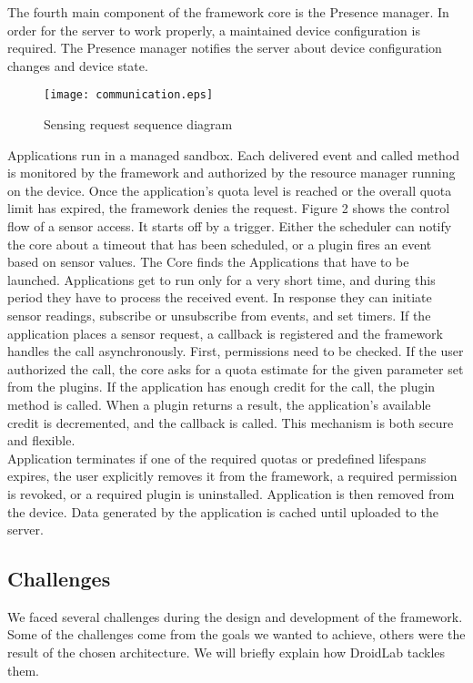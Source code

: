 \documentclass[conference,letterpaper]{IEEEtran}
\begin{document}
\indent The fourth main component of the framework core is the Presence manager. In order for the server to work properly, a maintained device configuration is required. The Presence manager notifies the server about device configuration changes and  device state.
\begin{figure}[h]
\centering
	\texttt{[image: communication.eps]}
	\label{fig:communicationImage}
\caption{Sensing request sequence diagram}
\end{figure}
Applications run in a managed sandbox. Each delivered event and called method is monitored by the framework and authorized by the resource manager running on the device. Once the application's quota level is reached or the overall quota limit has expired, the framework denies the request. Figure 2 shows the control flow of a sensor access. It starts off by a trigger. Either the scheduler can notify the core about a timeout that has been scheduled, or a plugin fires an event based on sensor values. The Core finds the Applications that have to be launched. Applications get to run only for a very short time, and during this period they have to process the received event. In response they can initiate sensor readings, subscribe or unsubscribe from events, and set timers. If the application places a sensor request, a callback is registered and the framework handles the call asynchronously. First, permissions need to be checked. If the user authorized the call, the core asks for a quota estimate for the given parameter set from the plugins. If the application has enough credit for the call, the plugin method is called. When a plugin returns a result, the application's available credit is decremented, and the callback is called. This mechanism is both secure and flexible.\\
\indent Application terminates if one of the required quotas or predefined lifespans expires, the user explicitly removes it from the framework, a required permission is revoked, or a required plugin is uninstalled. Application is then removed from the device. Data generated by the application is cached until uploaded to the server.
\subsection{Challenges}
We faced several challenges during the design and development of the framework. Some of the challenges come from the goals we wanted to achieve, others were the result of the chosen architecture. We will briefly explain how DroidLab tackles them.
\end{document}
